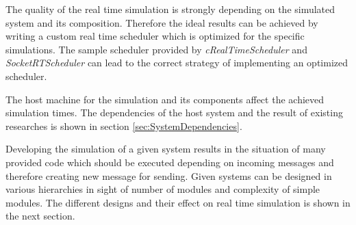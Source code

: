 The quality of the real time simulation is strongly depending on the simulated system and its composition.
Therefore the ideal results can be achieved by writing a custom real time scheduler which is optimized for the specific simulations.
The sample scheduler provided by \emph{cRealTimeScheduler} and \emph{SocketRTScheduler} can lead to the correct strategy of implementing an optimized scheduler.

The host machine for the simulation and its components affect the achieved simulation times.
The dependencies of the host system and the result of existing researches is shown in section \ref{sec:SystemDependencies}.

Developing the simulation of a given system results in the situation of many provided code which should be executed depending on incoming messages and therefore creating new message for sending.
Given systems can be designed in various hierarchies in sight of number of modules and complexity of simple modules.
The different designs and their effect on real time simulation is shown in the next section.

